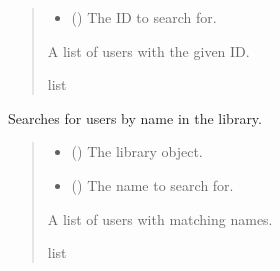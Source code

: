 \documentclass[letterpaper,10pt,english,openany,oneside]{sphinxmanual}
\begin{document}
\begin{fulllineitems}
\begin{fulllineitems}
\begin{quote}
\begin{description}
\begin{itemize}
\item {} 
\sphinxAtStartPar
{} () \textendash{} The ID to search for.

\end{itemize}

\sphinxAtStartPar
A list of users with the given ID.

\sphinxAtStartPar
list

\end{description}\end{quote}

\end{fulllineitems}


\begin{fulllineitems}
\label{\detokenize{user:user.User.search_by_name}}
\pysigstartsignatures
{}
\pysigstopsignatures
\sphinxAtStartPar
Searches for users by name in the library.
\begin{quote}\begin{description}
\begin{itemize}
\item {} 
\sphinxAtStartPar
{} ({\hyperref[\detokenize{library:library.Library}]{}}) \textendash{} The library object.

\item {} 
\sphinxAtStartPar
{} () \textendash{} The name to search for.

\end{itemize}

\sphinxAtStartPar
A list of users with matching names.

\sphinxAtStartPar
list

\end{description}\end{quote}


\end{fulllineitems}
\end{fulllineitems}
\end{document}
